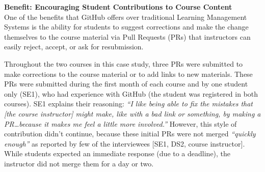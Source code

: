 



\textbf{Benefit: Encouraging Student Contributions to Course Content} \\
One of the benefits that GitHub offers over traditional Learning Management Systems is the ability for students to suggest corrections and make the change themselves to the course material via Pull Requests (PRs) that instructors can easily reject, accept, or ask for resubmission.

Throughout the two courses in this case study, three PRs were submitted to make corrections to the course material or to add links to new materials. These PRs were submitted during the first month of each course and by one student only (SE1), who had experience with GitHub (the student was registered in both courses). SE1 explains their reasoning: \textit{``I like being able to fix the mistakes that [the course instructor] might make, like with a bad link or something, by making a PR\ldots because it makes me feel a little more involved.''} However, this style of contribution didn't continue, because these initial PRs were not merged \textit{``quickly enough''} as reported by few of the interviewees [SE1, DS2, course instructor]. While students expected an immediate response (due to a deadline), the instructor did not merge them for a day or two.

